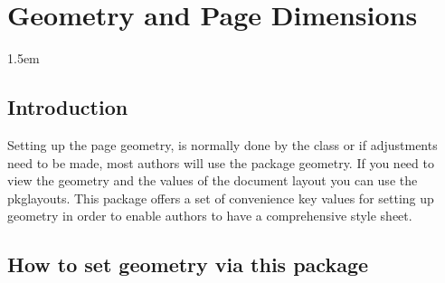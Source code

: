 %
%
%
%
%
%
%
%
%
%
%
%
%
%
%
%
%
%

\chapter{Geometry and Page Dimensions}
\parindent1.5em

\section{Introduction}

Setting up the page geometry, is normally done by the class or if adjustments need to be made, most authors will use the package geometry. If you need to view the geometry and the values of the document layout you can use the pkg{layouts}. This package offers a set of convenience key values for setting up geometry in order to enable authors to have a comprehensive style sheet.

\section{How to set geometry via this package}

